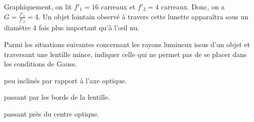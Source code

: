 
\begin{corrige}
Graphiquement, on lit $f'_1 = 16$ carreaux et $f'_2=4$ carreaux. Donc, on a $G=\frac{f'_1}{f'_2}=4$. Un objet lointain observé à travers cette lunette apparaîtra sous un diamètre 4 fois plus important qu'à l'\oe il nu.
\end{corrige}


\finEntrainement





\newpage





\hauteurLargeurCadreReponse		{8mm}{1.5cm}
\initialisationEntrainement


\debutEntrainement



\begin{enonce}
Parmi les situations suivantes concernant les rayons lumineux issus d'un objet et traversant une lentille mince, indiquer celle qui ne permet pas de se placer dans les conditions de Gauss. 
	
	\begin{listeQCM3Colonnes}
	\item peu inclinés par rapport à l'axe optique.
	\item passant par les bords de la lentille.
	\item passant près du centre optique.
	\end{listeQCM3Colonnes}

\end{enonce}

